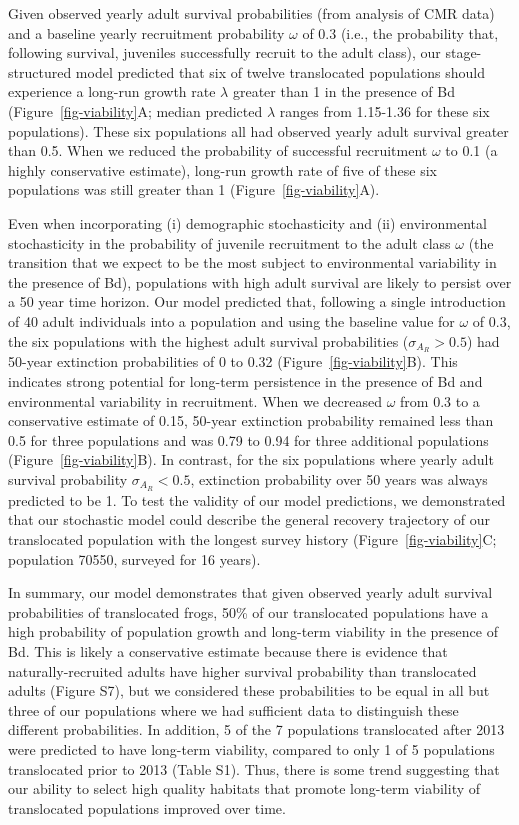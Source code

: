 \documentclass[9pt,twocolumn,twoside,lineno]{pnas-new}
\begin{document}
Given observed yearly adult survival probabilities (from analysis of CMR
data) and a baseline yearly recruitment probability \(\omega\) of 0.3
(i.e., the probability that, following survival, juveniles successfully
recruit to the adult class), our stage-structured model predicted that
six of twelve translocated populations should experience a long-run
growth rate \(\lambda\) greater than 1 in the presence of Bd
(Figure~\ref{fig-viability}A; median predicted \(\lambda\) ranges from
1.15-1.36 for these six populations). These six populations all had
observed yearly adult survival greater than 0.5. When we reduced the
probability of successful recruitment \(\omega\) to 0.1 (a highly
conservative estimate), long-run growth rate of five of these six
populations was still greater than 1 (Figure~\ref{fig-viability}A).

Even when incorporating (i) demographic stochasticity and (ii)
environmental stochasticity in the probability of juvenile recruitment
to the adult class \(\omega\) (the transition that we expect to be the
most subject to environmental variability in the presence of Bd),
populations with high adult survival are likely to persist over a 50
year time horizon. Our model predicted that, following a single
introduction of 40 adult individuals into a population and using the
baseline value for \(\omega\) of 0.3, the six populations with the
highest adult survival probabilities (\(\sigma_{A_R} > 0.5\)) had
50-year extinction probabilities of 0 to 0.32
(Figure~\ref{fig-viability}B). This indicates strong potential for
long-term persistence in the presence of Bd and environmental
variability in recruitment. When we decreased \(\omega\) from 0.3 to a
conservative estimate of 0.15, 50-year extinction probability remained
less than 0.5 for three populations and was 0.79 to 0.94 for three
additional populations (Figure~\ref{fig-viability}B). In contrast, for
the six populations where yearly adult survival probability
\(\sigma_{A_R} < 0.5\), extinction probability over 50 years was always
predicted to be 1. To test the validity of our model predictions, we
demonstrated that our stochastic model could describe the general
recovery trajectory of our translocated population with the longest
survey history (Figure~\ref{fig-viability}C; population 70550, surveyed
for 16 years).

In summary, our model demonstrates that given observed yearly adult
survival probabilities of translocated frogs, 50\% of our translocated
populations have a high probability of population growth and long-term
viability in the presence of Bd. This is likely a conservative estimate
because there is evidence that naturally-recruited adults have higher
survival probability than translocated adults
(Figure S7), but we considered these
probabilities to be equal in all but three of our populations where we
had sufficient data to distinguish these different probabilities. In
addition, 5 of the 7 populations translocated after 2013 were predicted
to have long-term viability, compared to only 1 of 5 populations
translocated prior to 2013 (Table S1). Thus,
there is some trend suggesting that our ability to select high quality
habitats that promote long-term viability of translocated populations
improved over time.
\end{document}
